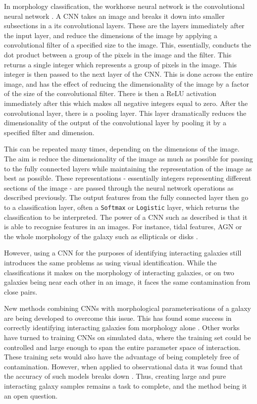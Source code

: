 In morphology classification, the workhorse neural network is the convolutional neural network \citep[CNN; examples include][]{2010MNRAS.406..342B, 2015ApJS..221....8H, 2020MNRAS.491.1554W, 2023ApJ...944..124T}. A CNN takes an image and breaks it down into smaller subsections in a its convolutional layers. These are the layers immediately after the input layer, and reduce the dimensions of the image by applying a convolutional filter of a specified size to the image. This, essentially, conducts the dot product between a group of the pixels in the image and the filter. This returns a single integer which represents a group of pixels in the image. This integer is then passed to the next layer of the CNN. This is done across the entire image, and has the effect of reducing the dimensionality of the image by a factor of the size of the convolutional filter. There is then a ReLU activation immediately after this which makes all negative integers equal to zero. After the convolutional layer, there is a pooling layer. This layer dramatically reduces the dimensionality of the output of the convolutional layer by pooling it by a specified filter and dimension.

This can be repeated many times, depending on the dimensions of the image. The aim is reduce the dimensionality of the image as much as possible for passing to the fully connected layers while maintaining the representation of the image as best as possible. These representations - essentially integers representing different sections of the image - are passed through the neural network operations as described previously. The output features from the fully connected layer then go to a classification layer, often a \texttt{Softmax} or \texttt{Logistic} layer, which returns the classification to be interpreted. The power of a CNN such as described is that it is able to recognise features in an images. For instance, tidal features, AGN or the whole morphology of the galaxy such as ellipticals or disks \citep[e.g][]{2018MNRAS.479..415A,2020ApJ...895..112G, 2022MNRAS.511.3330T, 2023ApJ...944..124T}. 

However, using a CNN for the purposes of identifying interacting galaxies still introduces the same problems as using visual identification. While the classifications it makes on the morphology of interacting galaxies, or on two galaxies being near each other in an image, it faces the same contamination from close pairs.

New methods combining CNNs with morphological parameterisations of a galaxy are being developed to overcome this issue. This has found some success in correctly identifying interacting galaxies fom morphology alone \citep{2023ApJ...958...96R}. Other works have turned to training CNNs on simulated data, where the training set could be controlled and large enough to span the entire parameter space of interaction. These training sets would also have the advantage of being completely free of contamination. However, when applied to observational data it was found that the accuracy of such models breaks down \citep{2019MNRAS.490.5390B, 2020A&C....3200390C}. Thus, creating large and pure interacting galaxy samples remains a task to complete, and the method being it an open question.

